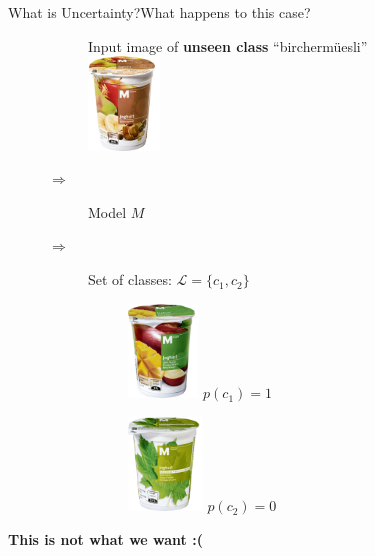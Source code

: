 \documentclass{beamer}
\begin{document}
\begin{frame}{What is Uncertainty?}{What happens to this case?}
\begin{figure}[H]
	\centering
	\begin{subfigure}{0.22\textwidth}
		\centering
		Input image  of \textbf{unseen class} ``birchermüesli''\\[.5cm]
		\includegraphics[height=2.5cm]{m-classic-joghurt-birchermueesli}
	\end{subfigure}$\Rightarrow$
	\begin{subfigure}{0.14\textwidth}
		\centering
		Model $M$
	\end{subfigure} $ \Rightarrow$
	\pause
	\begin{subfigure}{0.5\textwidth}
		\centering
		Set of classes:  $\mathcal{L}=\{c_1, c_2\}$\\ [.5cm]
		\begin{subfigure}{0.4\textwidth}
			\centering
			\includegraphics[height=2.5cm]{m-classic-joghurt-apfelmango}
			$p(c_1)=1$
		\end{subfigure}
		\begin{subfigure}{0.4\textwidth}
			\centering
			\includegraphics[height=2.5cm]{m-classic-joghurt-ahornsirup-stichfest} 
			$p(c_2)=0$
		\end{subfigure}
	\end{subfigure}
\end{figure}
\pause
\textbf{This is not what we want :(}
\end{frame}
\end{document}
